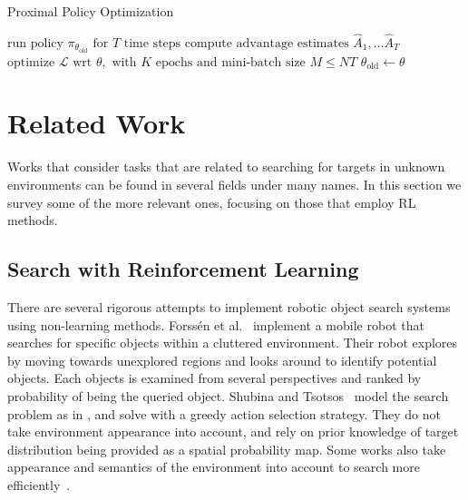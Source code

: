 \begin{algorithm}
    \caption{Proximal Policy Optimization}
    \label{alg:ppo}
    \begin{algorithmic}
                \State \(\text{run policy } \pi_{\theta_\text{old}} \text{ for } T \text{ time steps}\)
                \State \(\text{compute advantage estimates } \hat{A}_1, \dots \hat{A}_T\)
            \EndFor
            \State \(\text{optimize } \mathcal{L} \text{ wrt } \theta, \text{ with } K \text{ epochs and mini-batch size } M \leq NT\)
            \State \(\theta_{\text{old}} \leftarrow \theta\)
        \EndFor
    \end{algorithmic}
\end{algorithm}

\section{Related Work}
\label{sec:relatedwork}

Works that consider tasks that are related to searching for targets in unknown environments can be found in several fields under many names.
In this section we survey some of the more relevant ones, focusing on those that employ RL methods.

\subsection{Search with Reinforcement Learning}

There are several rigorous attempts to implement robotic object search systems using non-learning methods.
Forssén et al.~\cite{forssen_visual_2008} implement a mobile robot that searches for specific objects within a cluttered environment.
Their robot explores by moving towards unexplored regions and looks around to identify potential objects.
Each objects is examined from several perspectives and ranked by probability of being the queried object.
Shubina and Tsotsos~\cite{shubina_visualsearch_2010} model the search problem as in \cite{ye_tsotsos_2001}, and solve with a greedy action selection strategy.
They do not take environment appearance into account, and rely on prior knowledge of target distribution being provided as a spatial probability map.
Some works also take appearance and semantics of the environment into account to search more efficiently~\cite{aydemir_real_2011,aydemir_active_2013}.

